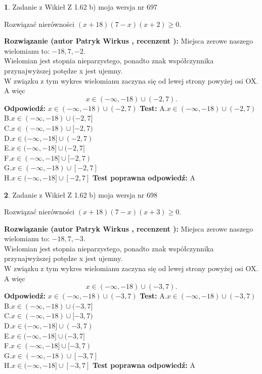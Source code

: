 \documentclass[12pt, a4paper]{article}
\theoremstyle{definition} %
\newtheorem{zad}{}
\newcommand{\zadStart}[1]{\begin{zad}#1\newline}
\newcommand{\zadStop}{\end{zad}}
\newcommand{\rozwStart}[2]{\noindent \textbf{Rozwiązanie (autor #1 , recenzent #2): }\newline}
\newcommand{\rozwStop}{\newline}
\newcommand{\odpStart}{\noindent \textbf{Odpowiedź:}\newline}
\newcommand{\odpStop}{\newline}
\newcommand{\testStart}{\noindent \textbf{Test:}\newline}
\newcommand{\testStop}{\newline}
\newcommand{\kluczStart}{\noindent \textbf{Test poprawna odpowiedź:}\newline}
\newcommand{\kluczStop}{\newline}
\begin{document}
\zadStart{Zadanie z Wikieł Z 1.62 b) moja wersja nr 697}

Rozwiązać nierówności $(x+18)(7-x)(x+2)\ge0$.
\zadStop
\rozwStart{Patryk Wirkus}{}
Miejsca zerowe naszego wielomianu to: $-18, 7, -2$.\\
Wielomian jest stopnia nieparzystego, ponadto znak współczynnika przy\linebreak najwyższej potędze x jest ujemny.\\ W związku z tym wykres wielomianu zaczyna się od lewej strony powyżej osi OX. A więc $$x \in (-\infty,-18) \cup (-2,7).$$
\rozwStop
\odpStart
$x \in (-\infty,-18) \cup (-2,7)$
\odpStop
\testStart
A.$x \in (-\infty,-18) \cup (-2,7)$\\
B.$x \in (-\infty,-18) \cup (-2,7]$\\
C.$x \in (-\infty,-18) \cup [-2,7)$\\
D.$x \in (-\infty,-18] \cup (-2,7)$\\
E.$x \in (-\infty,-18] \cup (-2,7]$\\
F.$x \in (-\infty,-18] \cup [-2,7)$\\
G.$x \in (-\infty,-18) \cup [-2,7]$\\
H.$x \in (-\infty,-18] \cup [-2,7]$
\testStop
\kluczStart
A
\kluczStop



\zadStart{Zadanie z Wikieł Z 1.62 b) moja wersja nr 698}

Rozwiązać nierówności $(x+18)(7-x)(x+3)\ge0$.
\zadStop
\rozwStart{Patryk Wirkus}{}
Miejsca zerowe naszego wielomianu to: $-18, 7, -3$.\\
Wielomian jest stopnia nieparzystego, ponadto znak współczynnika przy\linebreak najwyższej potędze x jest ujemny.\\ W związku z tym wykres wielomianu zaczyna się od lewej strony powyżej osi OX. A więc $$x \in (-\infty,-18) \cup (-3,7).$$
\rozwStop
\odpStart
$x \in (-\infty,-18) \cup (-3,7)$
\odpStop
\testStart
A.$x \in (-\infty,-18) \cup (-3,7)$\\
B.$x \in (-\infty,-18) \cup (-3,7]$\\
C.$x \in (-\infty,-18) \cup [-3,7)$\\
D.$x \in (-\infty,-18] \cup (-3,7)$\\
E.$x \in (-\infty,-18] \cup (-3,7]$\\
F.$x \in (-\infty,-18] \cup [-3,7)$\\
G.$x \in (-\infty,-18) \cup [-3,7]$\\
H.$x \in (-\infty,-18] \cup [-3,7]$
\testStop
\kluczStart
A
\kluczStop
\end{document}
